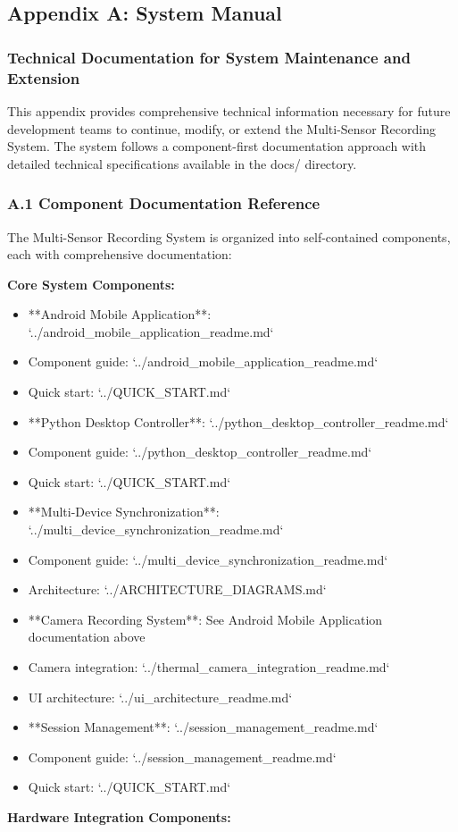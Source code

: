 \documentclass[12pt,a4paper]{article}
\begin{document}
\subsection{Appendix A: System Manual}

\subsubsection{Technical Documentation for System Maintenance and Extension}

This appendix provides comprehensive technical information necessary for future development teams to continue, modify,
or extend the Multi-Sensor Recording System. The system follows a component-first documentation approach with detailed
technical specifications available in the docs/ directory.

\subsubsection{A.1 Component Documentation Reference}

The Multi-Sensor Recording System is organized into self-contained components, each with comprehensive documentation:

\textbf{Core System Components:}

\begin{itemize}
\item **Android Mobile Application**: `../android_mobile_application_readme.md`
\item Component guide: `../android_mobile_application_readme.md`
\item Quick start: `../QUICK_START.md`

\item **Python Desktop Controller**: `../python_desktop_controller_readme.md`
\item Component guide: `../python_desktop_controller_readme.md`
\item Quick start: `../QUICK_START.md`

\item **Multi-Device Synchronization**: `../multi_device_synchronization_readme.md`
\item Component guide: `../multi_device_synchronization_readme.md`
\item Architecture: `../ARCHITECTURE_DIAGRAMS.md`

\item **Camera Recording System**: See Android Mobile Application documentation above
\item Camera integration: `../thermal_camera_integration_readme.md`
\item UI architecture: `../ui_architecture_readme.md`

\item **Session Management**: `../session_management_readme.md`
\item Component guide: `../session_management_readme.md`
\item Quick start: `../QUICK_START.md`

\end{itemize}
\textbf{Hardware Integration Components:}
\end{document}

